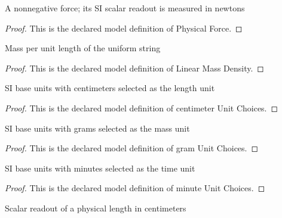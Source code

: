 \begin{definition}
  \label{def:physics:phyx-mini-0166:phyxminiproblems-problemphyxmini0166-physicalforce}
  A nonnegative force; its SI scalar readout is measured in newtons
\end{definition}
\begin{proof}
  This is the declared model definition of Physical Force.
\end{proof}
\begin{definition}
  \label{def:physics:phyx-mini-0166:phyxminiproblems-problemphyxmini0166-linearmassdensity}
  Mass per unit length of the uniform string
\end{definition}
\begin{proof}
  This is the declared model definition of Linear Mass Density.
\end{proof}
\begin{definition}
  \label{def:physics:phyx-mini-0166:phyxminiproblems-problemphyxmini0166-centimeterunitchoices}
  SI base units with centimeters selected as the length unit
\end{definition}
\begin{proof}
  This is the declared model definition of centimeter Unit Choices.
\end{proof}
\begin{definition}
  \label{def:physics:phyx-mini-0166:phyxminiproblems-problemphyxmini0166-gramunitchoices}
  SI base units with grams selected as the mass unit
\end{definition}
\begin{proof}
  This is the declared model definition of gram Unit Choices.
\end{proof}
\begin{definition}
  \label{def:physics:phyx-mini-0166:phyxminiproblems-problemphyxmini0166-minuteunitchoices}
  SI base units with minutes selected as the time unit
\end{definition}
\begin{proof}
  This is the declared model definition of minute Unit Choices.
\end{proof}
\begin{definition}
  \label{def:physics:phyx-mini-0166:phyxminiproblems-problemphyxmini0166-lengthincentimeters}
  Scalar readout of a physical length in centimeters
\end{definition}
